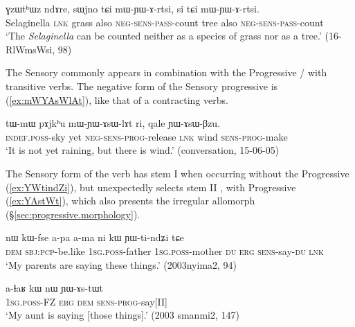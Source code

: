 \begin{exe}
\ex \label{ex:mWYArtsi}
\gll ɣzɯtʰɯz ndɤre, sɯjno tɕi mɯ-ɲɯ-ɤ-rtsi, si tɕi mɯ-ɲɯ-ɤ-rtsi. \\
Selaginella \textsc{lnk} grass also \textsc{neg}-\textsc{sens}-\textsc{pass}-count tree also \textsc{neg}-\textsc{sens}-\textsc{pass}-count \\
\glt `The \textit{Selaginella} can be counted neither as a species of grass nor as a tree.' (16-RlWmsWsi, 98)
\end{exe}

The Sensory commonly appears in combination with the Progressive / with transitive verbs. The negative form of the Sensory progressive is  (\ref{ex:mWYAsWlAt}), like that of a contracting verbs.

\begin{exe}
\ex \label{ex:mWYAsWlAt}
\gll   tɯ-mɯ pɤjkʰu mɯ-ɲɯ-ɤsɯ-lɤt ri, qale ɲɯ-ɤsɯ-βzu.\\
\textsc{indef}.\textsc{poss}-sky yet \textsc{neg}-\textsc{sens}-\textsc{prog}-release \textsc{lnk} wind \textsc{sens}-\textsc{prog}-make\\
\glt `It is not yet raining, but there is wind.' (conversation, 15-06-05)
\end{exe}

The Sensory form of the verb  has stem I  when occurring without the Progressive (\ref{ex:YWtindZi}), but unexpectedly selects stem II ,  with Progressive (\ref{ex:YAstWt}), which also presents the irregular allomorph  (§\ref{sec:progressive.morphology}).
 

\begin{exe}
\ex \label{ex:YWtindZi}
\gll nɯ kɯ-fse a-pa a-ma ni kɯ ɲɯ-ti-ndʑi tɕe \\
\textsc{dem} \textsc{sbj}:\textsc{pcp}-be.like \textsc{1sg}.\textsc{poss}-father \textsc{1sg}.\textsc{poss}-mother \textsc{du} \textsc{erg} \textsc{sens}-say-\textsc{du} \textsc{lnk} \\
\glt `My parents are saying these things.' (2003nyima2, 94)
\end{exe}

\begin{exe}
\ex \label{ex:YAstWt}
\gll a-ɬaʁ kɯ nɯ ɲɯ-ɤs-tɯt \\
\textsc{1sg}.\textsc{poss}-FZ \textsc{erg} \textsc{dem} \textsc{sens}-\textsc{prog}-say[II] \\
\glt `My aunt is saying [those things].' (2003 smanmi2, 147)
\end{exe}

